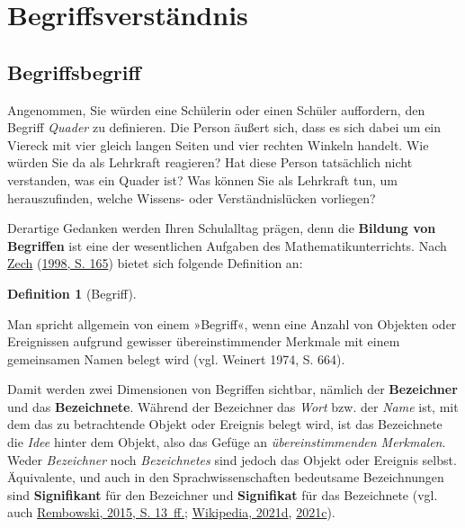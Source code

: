 \documentclass[
  ngerman,
]{scrbook}
\theoremstyle{definition}
\newtheorem{definition}{Definition}[chapter]
\theoremstyle{definition}
\theoremstyle{definition}
\theoremstyle{definition}
\theoremstyle{remark}
\begin{document}
\hypertarget{begriffsverstuxe4ndnis}{%
\section{Begriffsverständnis}\label{begriffsverstuxe4ndnis}}

\hypertarget{begriffsbegriff}{%
\subsection{Begriffsbegriff}\label{begriffsbegriff}}

Angenommen, Sie würden eine Schülerin oder einen Schüler auffordern, den Begriff \emph{Quader} zu definieren. Die Person äußert sich, dass es sich dabei um ein Viereck mit vier gleich langen Seiten und vier rechten Winkeln handelt. Wie würden Sie da als Lehrkraft reagieren? Hat diese Person tatsächlich nicht verstanden, was ein Quader ist? Was können Sie als Lehrkraft tun, um herauszufinden, welche Wissens- oder Verständnislücken vorliegen?

Derartige Gedanken werden Ihren Schulalltag prägen, denn die \textbf{Bildung von Begriffen} ist eine der wesentlichen Aufgaben des Mathematikunterrichts. Nach \protect\hyperlink{ref-Zech1998}{Zech} (\protect\hyperlink{ref-Zech1998}{1998, S. 165}) bietet sich folgende Definition an:

\begin{definition}[Begriff]
\protect\hypertarget{def:Begriff}{}\label{def:Begriff}

Man spricht allgemein von einem »Begriff«, wenn eine Anzahl von Objekten oder Ereignissen aufgrund gewisser übereinstimmender Merkmale mit einem gemeinsamen Namen belegt wird (vgl. Weinert 1974, S. 664).

\end{definition}

Damit werden zwei Dimensionen von Begriffen sichtbar, nämlich der \textbf{Bezeichner} und das \textbf{Bezeichnete}. Während der Bezeichner das \emph{Wort} bzw. der \emph{Name} ist, mit dem das zu betrachtende Objekt oder Ereignis belegt wird, ist das Bezeichnete die \emph{Idee} hinter dem Objekt, also das Gefüge an \emph{übereinstimmenden Merkmalen}. Weder \emph{Bezeichner} noch \emph{Bezeichnetes} sind jedoch das Objekt oder Ereignis selbst.
Äquivalente, und auch in den Sprachwissenschaften bedeutsame Bezeichnungen sind \textbf{Signifikant} für den Bezeichner und \textbf{Signifikat} für das Bezeichnete (vgl. auch \protect\hyperlink{ref-Rembowski2015}{Rembowski, 2015, S. 13~ff.}; \protect\hyperlink{ref-dewiki:214582005}{Wikipedia, 2021d}, \protect\hyperlink{ref-dewiki:212433603}{2021c}).
\end{document}

